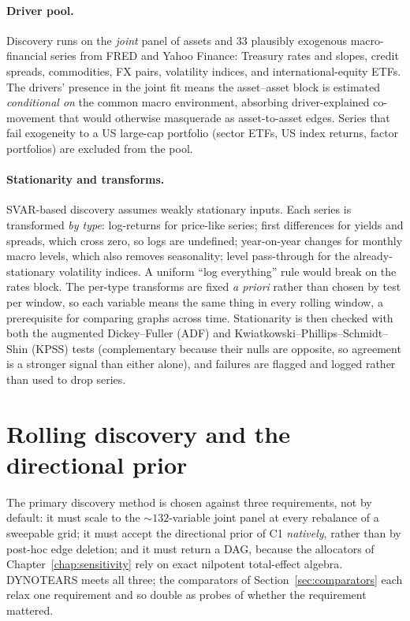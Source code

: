 \paragraph{Driver pool.} Discovery runs on the \emph{joint} panel of assets
and 33 plausibly exogenous macro-financial series from FRED and Yahoo Finance:
Treasury rates and slopes, credit spreads, commodities, FX pairs, volatility
indices, and international-equity ETFs. The drivers' presence in the joint
fit means the
asset--asset block is estimated \emph{conditional on} the common macro
environment, absorbing driver-explained co-movement that would otherwise
masquerade as asset-to-asset edges. Series that fail exogeneity to a US
large-cap portfolio (sector ETFs, US index returns, factor portfolios)
are excluded from the pool.

\paragraph{Stationarity and transforms.} SVAR-based discovery assumes weakly
stationary inputs. Each series is transformed \emph{by type}: log-returns for
price-like series; first differences for yields and spreads, which cross zero,
so logs are undefined; year-on-year changes for monthly macro levels, which
also removes seasonality; level pass-through for the already-stationary
volatility indices. A uniform ``log everything'' rule would break on the
rates block. The per-type transforms are fixed \emph{a priori} rather than
chosen by test per window, so each variable means the same thing in every
rolling window, a prerequisite for comparing graphs across time.
Stationarity is then checked with both the augmented Dickey--Fuller (ADF)
and Kwiatkowski--Phillips--Schmidt--Shin (KPSS) tests (complementary because
their nulls are opposite, so agreement is a stronger signal than either
alone), and failures are flagged and logged rather than used to drop
series.

\section{Rolling discovery and the directional prior}
\label{sec:discovery-run}

The primary discovery method is chosen against three requirements, not by
default: it must scale to the ${\sim}132$-variable joint panel at every
rebalance of a sweepable grid; it must accept the directional prior of C1
\emph{natively}, rather than by post-hoc edge deletion; and it must return
a DAG, because the allocators of Chapter~\ref{chap:sensitivity} rely
on exact nilpotent total-effect algebra. DYNOTEARS meets all three; the
comparators of Section~\ref{sec:comparators} each relax one requirement and
so double as probes of whether the requirement mattered.


